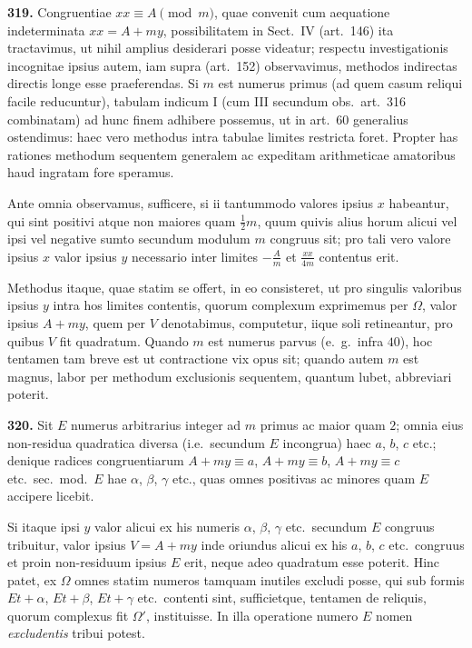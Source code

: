 \documentclass[12pt,a4paper]{article}
\theoremstyle{plain}
\theoremstyle{definition}
\theoremstyle{remark}
\begin{document}
\textbf{319.} Congruentiae $xx \equiv A \pmod{m}$, quae convenit cum aequatione indeterminata $xx = A + my$, possibilitatem in Sect.~IV (art.~146) ita tractavimus, ut nihil amplius desiderari posse videatur; respectu investigationis incognitae ipsius autem, iam supra (art.~152) observavimus, methodos indirectas directis longe esse praeferendas. Si $m$ est numerus primus (ad quem casum reliqui facile reducuntur), tabulam indicum I (cum III secundum obs.~art.~316 combinatam) ad hunc finem adhibere possemus, ut in art.~60 generalius ostendimus: haec vero methodus intra tabulae limites restricta foret. Propter has rationes methodum sequentem generalem ac expeditam arithmeticae amatoribus haud ingratam fore speramus.

Ante omnia observamus, sufficere, si ii tantummodo valores ipsius $x$ habeantur, qui sint positivi atque non maiores quam $\frac{1}{2}m$, quum quivis alius horum alicui vel ipsi vel negative sumto secundum modulum $m$ congruus sit; pro tali vero valore ipsius $x$ valor ipsius $y$ necessario inter limites $-\frac{A}{m}$ et $\frac{xx}{4m}$ contentus erit.

Methodus itaque, quae statim se offert, in eo consisteret, ut pro singulis valoribus ipsius $y$ intra hos limites contentis, quorum complexum exprimemus per $\Omega$, valor ipsius $A + my$, quem per $V$ denotabimus, computetur, iique soli retineantur, pro quibus $V$ fit quadratum. Quando $m$ est numerus parvus (e.~g.~infra $40$), hoc tentamen tam breve est ut contractione vix opus sit; quando autem $m$ est magnus, labor per methodum exclusionis sequentem, quantum lubet, abbreviari poterit.

\textbf{320.} Sit $E$ numerus arbitrarius integer ad $m$ primus ac maior quam $2$; omnia eius non-residua quadratica diversa (i.e.~secundum $E$ incongrua) haec $a$, $b$, $c$ etc.; denique radices congruentiarum $A + my \equiv a$, $A + my \equiv b$, $A + my \equiv c$ etc.~sec.~mod.~$E$ hae $\alpha$, $\beta$, $\gamma$ etc., quas omnes positivas ac minores quam $E$ accipere licebit.

Si itaque ipsi $y$ valor alicui ex his numeris $\alpha$, $\beta$, $\gamma$ etc.~secundum $E$ congruus tribuitur, valor ipsius $V = A + my$ inde oriundus alicui ex his $a$, $b$, $c$ etc.~congruus et proin non-residuum ipsius $E$ erit, neque adeo quadratum esse poterit. Hinc patet, ex $\Omega$ omnes statim numeros tamquam inutiles excludi posse, qui sub formis $Et + \alpha$, $Et + \beta$, $Et + \gamma$ etc.~contenti sint, sufficietque, tentamen de reliquis, quorum complexus fit $\Omega'$, instituisse. In illa operatione numero $E$ nomen \textit{excludentis} tribui potest.
\end{document}
